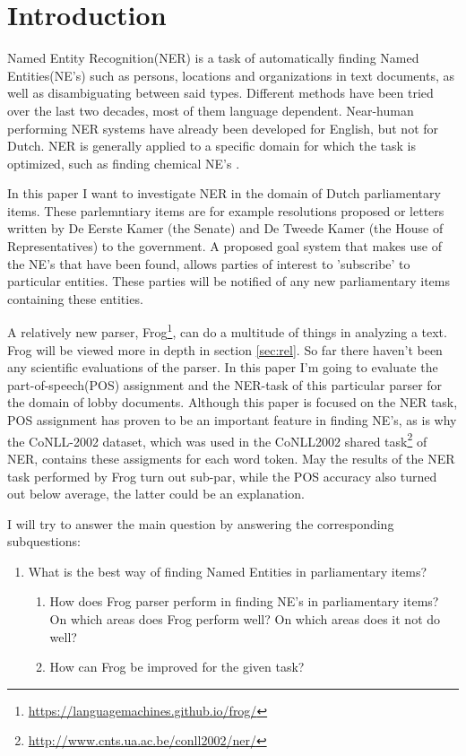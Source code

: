 \section{Introduction} \label{sec:introduction}
Named Entity Recognition(NER) is a task of automatically finding Named Entities(NE's) such as persons, locations and organizations in text documents, as well as disambiguating between said types. Different methods have been tried over the last two decades, most of them language dependent. Near-human performing NER systems have already been developed for English, but not for Dutch. NER is generally applied to a specific domain for which the task is optimized, such as finding chemical NE's \cite{rocktaschel2012chemspot}. 

In this paper I want to investigate NER in the domain of Dutch parliamentary items. These parlemntiary items are for example resolutions proposed or letters written by De Eerste Kamer (the Senate) and De Tweede Kamer (the House of Representatives) to the government. A proposed goal system that makes use of the NE's that have been found, allows parties of interest to 'subscribe' to particular entities. These parties will be notified of any new parliamentary items containing these entities. 

A relatively new parser, Frog\footnote{\url{https://languagemachines.github.io/frog/}}, can do a multitude of things in analyzing a text. Frog will be viewed more in depth in section \ref{sec:rel}. So far there haven't been any scientific evaluations of the parser. In this paper I'm going to evaluate the part-of-speech(POS) assignment and the NER-task of this particular parser for the domain of lobby documents. Although this paper is focused on the NER task, POS assignment has proven to be an important feature in finding NE's, as is why the CoNLL-2002 dataset, which was used in the CoNLL2002 shared task\footnote{\url{http://www.cnts.ua.ac.be/conll2002/ner/}} of NER, contains these assigments for each word token. May the results of the NER task performed by Frog turn out sub-par, while the POS accuracy also turned out below average, the latter could be an explanation.

I will try to answer the main question by answering the corresponding subquestions:
\begin{enumerate}
    \item What is the best way of finding Named Entities in parliamentary items?
    \begin{enumerate}
        \item   How does Frog parser perform in finding NE's in parliamentary items?  On which areas does Frog perform well? On which areas does it not do well?
        \item How can Frog be improved for the given task?
    \end{enumerate}
\end{enumerate}



